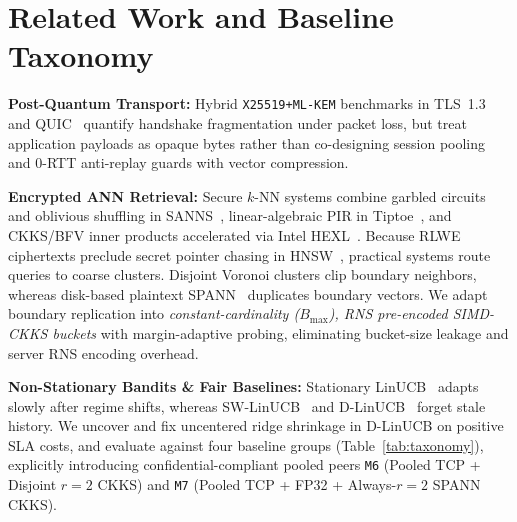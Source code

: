 \documentclass[10pt,journal,compsoc]{IEEEtran}
\begin{document}
\section{Related Work and Baseline Taxonomy}\label{sec:related}
\textbf{Post-Quantum Transport:} Hybrid \texttt{X25519+ML-KEM} benchmarks in TLS~1.3 and QUIC~\cite{stebila2016liboqs, paquin2020pqctls, iyengar2021quic} quantify handshake fragmentation under packet loss, but treat application payloads as opaque bytes rather than co-designing session pooling and 0-RTT anti-replay guards with vector compression.

\textbf{Encrypted ANN Retrieval:} Secure $k$-NN systems combine garbled circuits and oblivious shuffling in SANNS~\cite{chen2020sanns}, linear-algebraic PIR in Tiptoe~\cite{henzinger2023tiptoe}, and CKKS/BFV inner products accelerated via Intel HEXL~\cite{boemer2021hexl, zhu2023compass}. Because RLWE ciphertexts preclude secret pointer chasing in HNSW~\cite{malkov2020hnsw}, practical systems route queries to coarse clusters. Disjoint Voronoi clusters clip boundary neighbors, whereas disk-based plaintext SPANN~\cite{chen2021spann} duplicates boundary vectors. We adapt boundary replication into \emph{constant-cardinality ($B_{\max}$), RNS pre-encoded SIMD-CKKS buckets} with margin-adaptive probing, eliminating bucket-size leakage and server RNS encoding overhead.

\textbf{Non-Stationary Bandits \& Fair Baselines:} Stationary LinUCB~\cite{li2010linucb} adapts slowly after regime shifts, whereas SW-LinUCB~\cite{garivier2011swucb} and D-LinUCB~\cite{russac2019dlinucb} forget stale history. We uncover and fix uncentered ridge shrinkage in D-LinUCB on positive SLA costs, and evaluate against four baseline groups (Table~\ref{tab:taxonomy}), explicitly introducing confidential-compliant pooled peers \texttt{M6} (Pooled TCP + Disjoint $r=2$ CKKS) and \texttt{M7} (Pooled TCP + FP32 + Always-$r=2$ SPANN CKKS).
\end{document}
